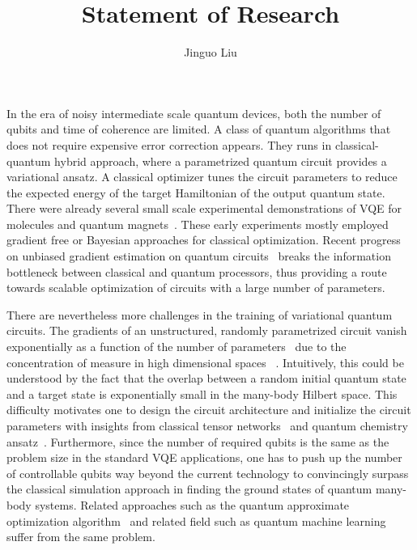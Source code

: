 \documentclass[]{article}
\date{}
\title{Statement of Research}
\author{Jinguo Liu}
\begin{document}
\maketitle

In the era of noisy intermediate scale quantum devices, both the number of qubits and time of coherence are limited. A class of quantum algorithms that does not require expensive error correction appears. They runs in classical-quantum hybrid approach, where a parametrized quantum circuit provides a variational ansatz. A classical optimizer tunes the circuit parameters to reduce the expected energy of the target Hamiltonian of the output quantum state. There were already several small scale experimental demonstrations of VQE for molecules and quantum magnets~\cite{Shen2017, OMalley2016, Kandala2017,Colless2018, Hempel2018}. These early experiments mostly employed gradient free or Bayesian approaches for classical optimization. Recent progress on unbiased gradient estimation on quantum circuits~\cite{Li2017a, Mitarai2018, Liu2018, Verdon2018, Schuld2018, Javier2018, Bergholm2018, Guerreschi2017,Farhi2018,Romero2018,Harrow2019,Dallaire2018} breaks the information bottleneck between classical and quantum processors, thus
providing a route towards scalable optimization of circuits with a large number of parameters.

There are nevertheless more challenges in the training of variational quantum circuits.
The gradients of an unstructured, randomly parametrized circuit vanish exponentially as a function of the number of parameters~\cite{McClean2018} due to the concentration of measure in high dimensional spaces ~\cite{Gross2009,Bremner2009}.
Intuitively, this could be understood by the fact that the overlap between a random initial
quantum state and a target state is exponentially small in the many-body Hilbert space. This difficulty motivates one to design the circuit architecture and initialize the circuit parameters with insights from classical tensor networks~\cite{Huggins2019, Kim2017,Peng2019}
and quantum chemistry ansatz~\cite{Yung2014, Lee2018, Barkoutsos2018}. %
Furthermore, since the number of required qubits is the same as the problem size in the standard VQE applications, one has to push up the number of controllable qubits way beyond the current technology to convincingly surpass the classical simulation approach in finding the ground states of quantum many-body systems.
Related approaches such as  the quantum approximate optimization algorithm~\cite{Farhi2014} and related field such as quantum machine learning~\cite{Ciliberto2017, Mitarai2018, Liu2018} suffer from the same problem.
\end{document}
